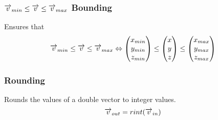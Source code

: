 \subsubsection*{$\overrightarrow{v}_{min} \leq \overrightarrow{v} \leq \overrightarrow{v}_{max}$ Bounding}
Ensures that
\begin{equation}
\overrightarrow{v}_{min} \leq \overrightarrow{v} \leq \overrightarrow{v}_{max} \Leftrightarrow \begin{pmatrix} x_{min} \\ y_{min} \\ z_{min} \end{pmatrix} \leq \begin{pmatrix} x \\ y \\ z \end{pmatrix} \leq \begin{pmatrix} x_{max} \\ y_{max} \\ z_{max} \end{pmatrix}
\end{equation}

\subsubsection*{Rounding}
Rounds the values of a double vector to integer values.
\begin{equation}
\overrightarrow{v}_{out} = rint(\overrightarrow{v}_{in})
\end{equation}

